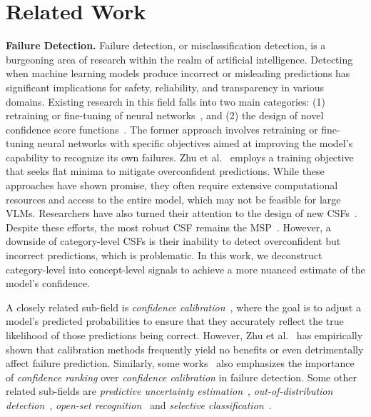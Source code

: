 \section{Related Work}
\textbf{Failure Detection.}
Failure detection, or misclassification detection, is a burgeoning area of research within the realm of artificial intelligence. 
Detecting when machine learning models produce incorrect or misleading predictions has significant implications for safety, reliability, and transparency in various domains.
Existing research in this field falls into two main categories: (1) retraining or fine-tuning of neural networks~\cite{Moon2020ConfidenceAwareLF,Zhu2023OpenMixEO,Zhu2023RethinkingCC}, and (2) the design of novel confidence score functions~\cite{Granese2021DOCTORAS,Hendrycks2016ABF}. 
The former approach involves retraining or fine-tuning neural networks with specific objectives aimed at improving the model's capability to recognize its own failures.
Zhu et al.~\cite{Zhu2023RethinkingCC} employs a training objective that seeks flat minima to mitigate overconfident predictions. While these approaches have shown promise, they often require extensive computational resources and access to the entire model, which may not be feasible for large VLMs.
Researchers have also turned their attention to the design of new CSFs~\cite{Granese2021DOCTORAS}.
Despite these efforts, the most robust CSF remains the MSP~\cite{jaeger2023a}. 
However, a downside of category-level CSFs is their inability to detect overconfident but incorrect predictions, which is problematic. 
In this work, we deconstruct category-level into concept-level signals to achieve a more nuanced estimate of the model's confidence.

A closely related sub-field is \textit{confidence calibration}~\cite{minderer2021revisiting,levine2023enabling,Mukhoti_2020_NIPS,pereyra2017regularizing}, where the goal is to adjust a model's predicted probabilities to ensure that they accurately reflect the true likelihood of those predictions being correct.
However, Zhu et al.~\cite{Zhu2023RethinkingCC} has empirically shown that calibration methods frequently yield no benefits or even detrimentally affect failure prediction.
Similarly, some works~\cite{jaeger2023a,Bernhardt2022FailureDI} also emphasizes the importance of \textit{confidence ranking} over \textit{confidence calibration} in failure detection. 
Some other related sub-fields are \textit{predictive uncertainty estimation}~\cite{pmlr-v48-gal16, BlundellJMLR15, LakshminarayananNIPS17, Mukhoti_2023_CVPR}, \textit{out-of-distribution detection}~\cite{Zhu2023OpenMixEO, liang2020enhancing, pmlr-v180-dinari22a,lee2018simple}, \textit{open-set recognition}~\cite{vaze2022openset, Geng_2021} and \textit{selective classification}~\cite{geifman2017selective,fisch2022calibrated}.

